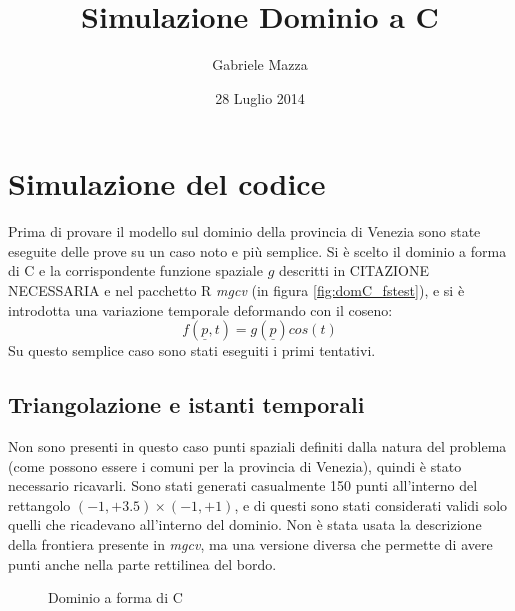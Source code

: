 \documentclass[a4paper,11pt,twoside,openright]{book}							%
\date{28 Luglio 2014}
\author{Gabriele Mazza}
\title{Simulazione Dominio a C}
\begin{document}

\chapter{Simulazione del codice}

Prima di provare il modello sul dominio della provincia di Venezia sono state eseguite delle prove su un caso noto e più semplice. Si è scelto il dominio a forma di C e la corrispondente funzione spaziale $g$ descritti in CITAZIONE NECESSARIA e nel pacchetto R \textit{mgcv} (in figura \ref{fig:domC_fstest}), e si è introdotta una variazione temporale deformando con il coseno:
$$
f(\underline p, t)=g(\underline p)cos(t)
$$
Su questo semplice caso sono stati eseguiti i primi tentativi.


\section{Triangolazione e istanti temporali}
Non sono presenti in questo caso punti spaziali definiti dalla natura del problema (come possono essere i comuni per la provincia di Venezia), quindi è stato necessario ricavarli. Sono stati generati casualmente 150 punti all'interno del rettangolo $(-1,+3.5) \times (-1,+1)$, e di questi sono stati considerati validi solo quelli che ricadevano all'interno del dominio. Non è stata usata la descrizione della frontiera presente in \textit{mgcv}, ma una versione diversa che permette di avere punti anche nella parte rettilinea del bordo.
\begin{figure}[!t]
\centering
{}
\caption{Dominio a forma di C}
\label{fig:domC}
\end{figure}
\end{document}
